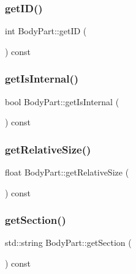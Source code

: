 \mbox{\label{class_body_part_a3fd271dfacdd0f34b80e287d532dea64}} 
\subsubsection{\texorpdfstring{get\+I\+D()}{getID()}}
{\footnotesize\ttfamily int Body\+Part\+::get\+ID (\begin{DoxyParamCaption}{ }\end{DoxyParamCaption}) const}

\mbox{\label{class_body_part_a9a7b684a14febfb06d1c5abfdc99ed89}} 
\subsubsection{\texorpdfstring{get\+Is\+Internal()}{getIsInternal()}}
{\footnotesize\ttfamily bool Body\+Part\+::get\+Is\+Internal (\begin{DoxyParamCaption}{ }\end{DoxyParamCaption}) const}

\mbox{\label{class_body_part_a195def981a8f414a0456c9dfb2a70c0d}} 
\subsubsection{\texorpdfstring{get\+Relative\+Size()}{getRelativeSize()}}
{\footnotesize\ttfamily float Body\+Part\+::get\+Relative\+Size (\begin{DoxyParamCaption}{ }\end{DoxyParamCaption}) const}

\mbox{\label{class_body_part_a1603cca73c99ce6f2f2ca5c73e387594}} 
\subsubsection{\texorpdfstring{get\+Section()}{getSection()}}
{\footnotesize\ttfamily std\+::string Body\+Part\+::get\+Section (\begin{DoxyParamCaption}{ }\end{DoxyParamCaption}) const}

